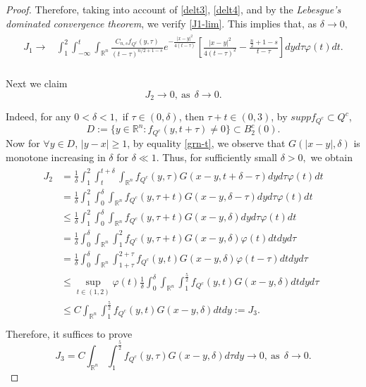 \documentclass[10pt,a4paper]{amsart}
\newcommand{\R}{\mathbb{R}}
\newcommand{\mb}{\mbox}
\begin{document}
\begin{proof}
Therefore, taking into account of \eqref{delt3}, \eqref{delt4}, and by the {\em Lebesgue's dominated convergence theorem}, we verify \eqref{J1-lim}.  This implies that, as $\delta\to 0,$
\begin{eqnarray}\label{est-J1}
\begin{aligned}
J_1\to&\int_1^2\int_{-\infty}^{t}\int_{\R^n}\frac{C_{n,s}f_{Q^c}(y,\tau)}{{(t-\tau)}^{n/2+1-s}} e^{-\frac{|x-y|^2}{4(t-\tau)}}\left[\frac{|x-y|^2}{4(t-\tau)^2}-\frac{\frac{n}{2}+1-s}{t-\tau}\right]dyd\tau\varphi(t)dt.\\
\end{aligned}
\end{eqnarray}

Next we claim \begin{equation}\label{est-J2}J_2\to 0, \ \mb{as}\ \ \delta\to 0.\end{equation}

Indeed, for any $0<\delta<1,$ if $\tau\in(0,\delta)$, then $\tau+t\in(0,3)$, by $supp f_{Q^c}\subset Q^c$,
\[D:=\{y\in\R^n:f_{Q^c}(y,t+\tau)\neq 0\}\subset B_2^c(0).\]
 Now for $\forall y\in D$, $|y-x|\geq 1$,  by equality \eqref{grn-t}, we observe that $G(|x-y|,\delta)$ is monotone increasing in $\delta$ for $\delta\ll1$.  %
Thus, for sufficiently small $\delta>0,$ we obtain
\begin{eqnarray}\label{est-t2}
\begin{aligned}
J_2&=\frac{1}{\delta}\int_1^2\int_{t}^{t+\delta}\int_{\R^n}f_{Q^c}(y,\tau)G(x-y,t+\delta-\tau)dyd\tau\varphi(t)dt\\
&=\frac{1}{\delta}\int_1^2\int_{0}^{\delta}\int_{\R^n}f_{Q^c}(y,\tau+t)G(x-y,\delta-\tau)dyd\tau\varphi(t)dt\\
&\leq\frac{1}{\delta}\int_1^2\int_{0}^{\delta}\int_{\R^n}f_{Q^c}(y,\tau+t)G(x-y,\delta)dyd\tau\varphi(t)dt\\
&=\frac{1}{\delta}\int_{0}^{\delta}\int_{\R^n}\int_1^2f_{Q^c}(y,\tau+t)G(x-y,\delta)\varphi(t)dtdyd\tau\\
&=\frac{1}{\delta}\int_{0}^{\delta}\int_{\R^n}\int_{1+\tau}^{2+\tau}f_{Q^c}(y,t)G(x-y,\delta)\varphi(t-\tau)dtdyd\tau\\
&\leq \sup_{t\in(1,2)}\varphi(t)\frac{1}{\delta}\int_{0}^{\delta}\int_{\R^n}\int_{1}^{\frac{5}{2}}f_{Q^c}(y,t)G(x-y,\delta)dtdyd\tau\\
&\leq C\int_{\R^n}\int_{1}^{\frac{5}{2}}f_{Q^c}(y,t)G(x-y,\delta)dtdy:=J_3.\\
\end{aligned}
\end{eqnarray}
Therefore, it suffices to prove
\begin{equation}\label{est-J3}J_3=C\int_{\R^n}\int_{1}^{\frac{5}{2}}f_{Q^c}(y,\tau)G(x-y,\delta)d\tau dy\to 0, \ \mb{as}\ \ \delta\to 0.\end{equation}


\end{proof}
\end{document}
